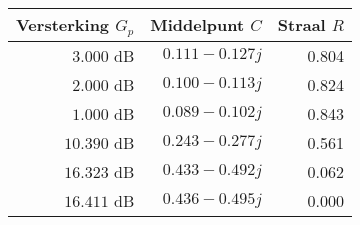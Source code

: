 \begin{tabular}{|r|r|r|} \hline 
\textbf{Versterking $G_p$} & \textbf{Middelpunt $C$} & \textbf{Straal $R$} \\ \hline 
$ 3.000$ \mbox{dB} & $ 0.111 -0.127 j$ &  0.804 \\ \hline 
$ 2.000$ \mbox{dB} & $ 0.100 -0.113 j$ &  0.824 \\ \hline 
$ 1.000$ \mbox{dB} & $ 0.089 -0.102 j$ &  0.843 \\ \hline 
$10.390$ \mbox{dB} & $ 0.243 -0.277 j$ &  0.561 \\ \hline 
$16.323$ \mbox{dB} & $ 0.433 -0.492 j$ &  0.062 \\ \hline 
$16.411$ \mbox{dB} & $ 0.436 -0.495 j$ &  0.000 \\ \hline 
\end{tabular}